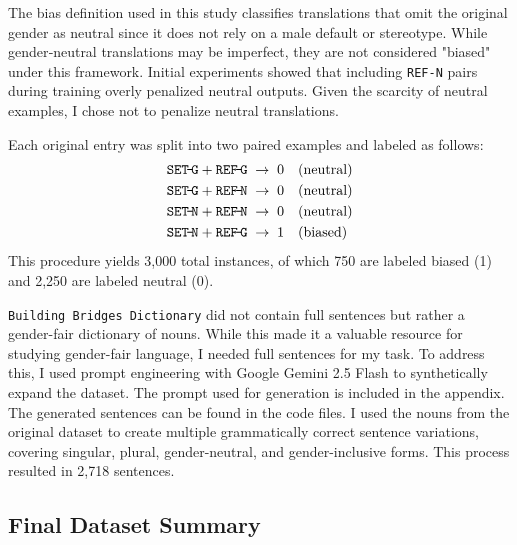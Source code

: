 \noindent
The bias definition used in this study classifies translations that omit the original gender as neutral since it does not rely on a male default or stereotype. While gender‑neutral translations may be imperfect, they are not considered "biased" under this framework. Initial experiments showed that including \texttt{REF-N} pairs during training overly penalized neutral outputs. Given the scarcity of neutral examples, I chose not to penalize neutral translations. 

Each original entry was split into two paired examples and labeled as follows:  
\[
\begin{aligned}
\texttt{SET\!-\!G} + \texttt{REF\!-\!G} &\;\rightarrow\; 0 \quad(\text{neutral})\\
\texttt{SET\!-\!G} + \texttt{REF\!-\!N} &\;\rightarrow\; 0 \quad(\text{neutral})\\
\texttt{SET\!-\!N} + \texttt{REF\!-\!N} &\;\rightarrow\; 0 \quad(\text{neutral})\\
\texttt{SET\!-\!N} + \texttt{REF\!-\!G} &\;\rightarrow\; 1 \quad(\text{biased})
\end{aligned}
\]  
This procedure yields 3,000 total instances, of which 750 are labeled biased (1) and 2,250 are labeled neutral (0).  


\texttt{Building Bridges Dictionary} did not contain full sentences but rather a gender-fair dictionary of nouns. While this made it a valuable resource for studying gender-fair language, I needed full sentences for my task. To address this, I used prompt engineering with Google Gemini 2.5 Flash to synthetically expand the dataset. The prompt used for generation is included in the appendix. The generated sentences can be found in the code files. I used the nouns from the original dataset to create multiple grammatically correct sentence variations, covering singular, plural, gender-neutral, and gender-inclusive forms. This process resulted in 2,718 sentences.

\subsection{Final Dataset Summary}

